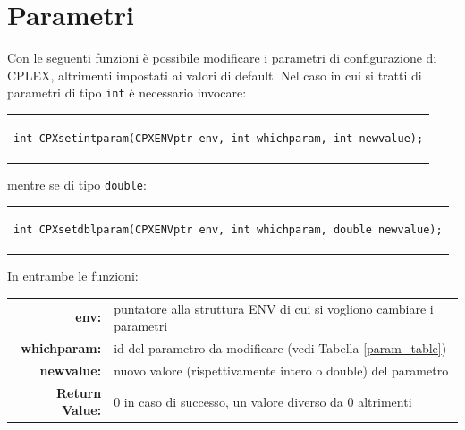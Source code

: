 \section{Parametri}\label{param}
Con le seguenti funzioni è possibile modificare i parametri di configurazione di CPLEX, altrimenti impostati ai valori di default.
Nel caso in cui si tratti di parametri di tipo \texttt{int} è necessario invocare:\\
\begin{center}
\begin{tabular}{c}
\begin{lstlisting}[linewidth=330pt, basicstyle=\footnotesize\sffamily,]     
int CPXsetintparam(CPXENVptr env, int whichparam, int newvalue);
\end{lstlisting}
\end{tabular}
\end{center}
mentre se di tipo \texttt{double}:\\
\begin{center}
\begin{tabular}{c}
\begin{lstlisting}[linewidth=340pt, basicstyle=\footnotesize\sffamily,]  
int CPXsetdblparam(CPXENVptr env, int whichparam, double newvalue);
\end{lstlisting}
\end{tabular}
\end{center}
In entrambe le funzioni:
\begin{table}[h]
\centering
\begin{tabular}{rl}
\textbf{env:} & {puntatore alla struttura ENV di cui si vogliono cambiare i parametri}\\
\textbf{whichparam:} & {id del parametro da modificare (vedi Tabella \ref{param_table})}\\
\textbf{newvalue:} & {nuovo valore (rispettivamente intero o double) del parametro}\\
\textbf{Return Value:} & {0 in caso di successo, un valore diverso da 0 altrimenti}\\
\end{tabular}
\end{table}
